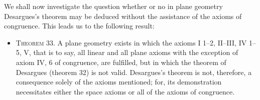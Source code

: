 \documentclass[11pt,oneside]{book}
\begin{document}
We shall now investigate the question whether or
no in plane geometry Desargues's theorem may be
deduced without the assistance of the axioms of congruence.
This leads us to the following result:

\begin{itemize}
\item[]{\scshape Theorem 33.} A plane geometry exists in which
the axioms I 1--2, II--III, IV 1--5, V, that is to
say, all linear and all plane axioms with the
exception of axiom IV, 6 of congruence, are
fulfilled, but in which the theorem of Desargues
(theorem 32) is not valid. Desargues's theorem
is not, therefore, a consequence solely of the
axioms mentioned; for, its demonstration necessitates
either the space axioms or all of the
axioms of congruence.
\end{itemize}
\end{document}
